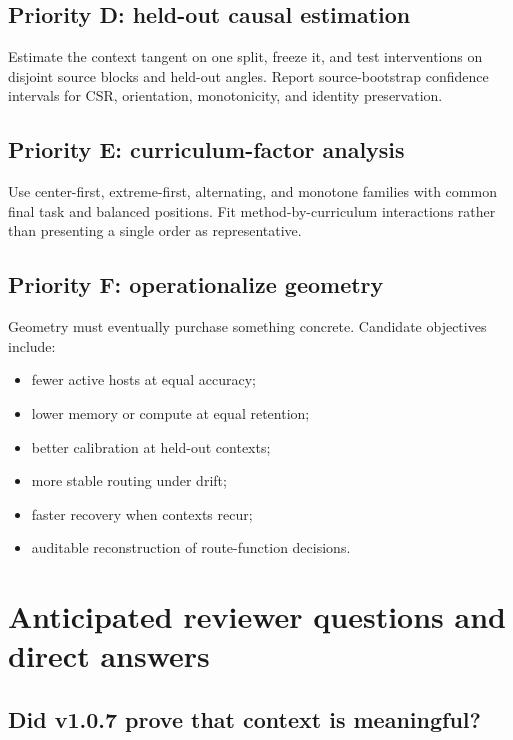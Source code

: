 \documentclass[11pt,a4paper]{article}
\begin{document}
\subsection{Priority D: held-out causal estimation}

Estimate the context tangent on one split, freeze it, and test interventions on disjoint source blocks and held-out angles. Report source-bootstrap confidence intervals for CSR, orientation, monotonicity, and identity preservation.

\subsection{Priority E: curriculum-factor analysis}

Use center-first, extreme-first, alternating, and monotone families with common final task and balanced positions. Fit method-by-curriculum interactions rather than presenting a single order as representative.

\subsection{Priority F: operationalize geometry}

Geometry must eventually purchase something concrete. Candidate objectives include:

\begin{itemize}
\item fewer active hosts at equal accuracy;
\item lower memory or compute at equal retention;
\item better calibration at held-out contexts;
\item more stable routing under drift;
\item faster recovery when contexts recur;
\item auditable reconstruction of route-function decisions.
\end{itemize}

\section{Anticipated reviewer questions and direct answers}

\subsection*{Did v1.0.7 prove that context is meaningful?}
\end{document}

